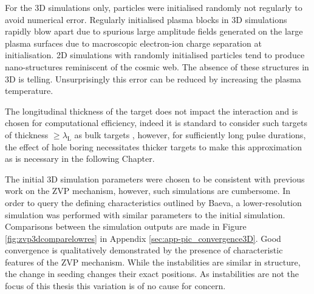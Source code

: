For the 3D simulations only, particles were initialised randomly not regularly to avoid numerical error. Regularly initialised plasma blocks in 3D simulations rapidly blow apart due to spurious large amplitude fields generated on the large plasma surfaces due to macroscopic electron-ion charge separation at initialisation. 2D simulations with randomly initialised particles tend to produce nano-structures reminiscent of the cosmic web. The absence of these structures in 3D is telling. Unsurprisingly this error can be reduced by increasing the plasma temperature.

The longitudinal thickness of the target does not impact the interaction and is chosen for computational efficiency, indeed it is standard to consider such targets of thickness $\ge \lambda_\mathrm{L}$ as bulk targets \cite{dollarEnhancedLaserAbsorption2017}, however, for sufficiently long pulse durations, the effect of hole boring necessitates thicker targets to make this approximation as is necessary in the following Chapter.

The initial 3D simulation parameters were chosen to be consistent with previous work on the \ac{ZVP} mechanism, however, such simulations are cumbersome. In order to query the defining characteristics outlined by Baeva, a lower-resolution simulation was performed with similar parameters to the initial simulation. Comparisons between the simulation outputs are made in Figure \ref{fig:zvp3dcomparelowres} in Appendix \ref{sec:app-pic_convergence3D}. Good convergence is qualitatively demonstrated by the presence of characteristic features of the ZVP mechanism. While the instabilities are similar in structure, the change in seeding changes their exact positions. As instabilities are not the focus of this thesis this variation is of no cause for concern.

